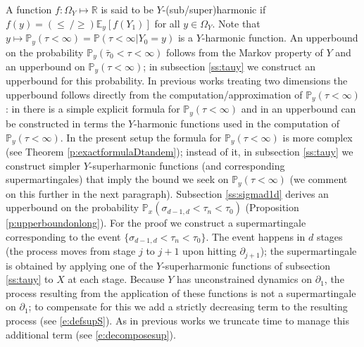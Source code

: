\documentclass[11pt,a4paper]{article}
\begin{document}
A function $f:\Omega_Y \mapsto {\mathbb R}$ is said to be 
$Y$-(sub/super)harmonic  
if
 $f(y) = (\le ~/ \ge) {\mathbb E}_y[f(Y_1)] $
for all $y \in \Omega_Y$.
Note that $y\mapsto {\mathbb P}_y(\tau < \infty ) ={\mathbb P}(\tau < \infty | Y_0 = y)$ is a $Y$-harmonic function.
An upperbound on the probability
${\mathbb P}_y(\bar\tau_0 < \tau < \infty)$
follows from the Markov property of $Y$
and an upperbound on 
${\mathbb P}_y(\tau < \infty )$;
in subsection \ref{ss:tauy} we construct an upperbound for this probability.
In previous works treating two dimensions the upperbound follows
directly from the computation/approximation of ${\mathbb P}_y(\tau < \infty)$:
in \cite{sezer2018approximation} there is a simple explicit formula for ${\mathbb P}_y(\tau <\infty)$ and in \cite{kabran2020approximation} an upperbound can be constructed in terms
the $Y$-harmonic functions used in the computation of
${\mathbb P}_y(\tau < \infty).$
In the present setup the formula for ${\mathbb P}_y(\tau < \infty)$ is
more complex (see Theorem \ref{p:exactformulaDtandem}); 
instead of it, in subsection \ref{ss:tauy} we construct
simpler $Y$-superharmonic functions (and corresponding supermartingales) 
that imply the bound we seek
on ${\mathbb P}_y(\tau < \infty)$ (we comment on this further in the next paragraph).
Subsection \ref{ss:sigmad1d} derives an upperbound on the probability
${\mathbb P}_x(\sigma_{d-1,d} < \tau_n < \tau_0)$
(Proposition \ref{p:upperboundonlong}). For the proof we construct
a supermartingale corresponding to the event 
$\{\sigma_{d-1,d} < \tau_n < \tau_0\}$. The event happens in $d$
stages (the process moves from stage $j$ to $j+1$ upon hitting
$\partial_{j+1}$); the supermartingale is obtained by applying one
of the $Y$-superharmonic functions of subsection \ref{ss:tauy} to $X$ at each stage.
Because $Y$ has unconstrained dynamics on $\partial_1$, the process resulting
from the application of these functions is not a supermartingale on $\partial_1$;
to compensate for this we add a strictly decreasing term to the resulting process (see \eqref{e:defsupS}).
As in previous works \cite{sezer2018approximation,unlu2019excessive,kabran2020approximation} we truncate time 
to manage this additional term (see \eqref{e:decomposesup}).
\end{document}
